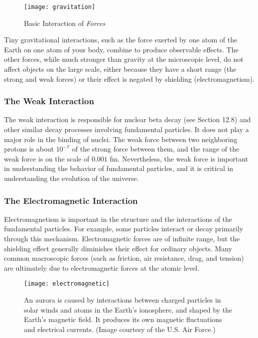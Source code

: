 \documentclass[12pt, a4paper]{article}
\begin{document}
\begin{figure}
\texttt{[image: gravitation]}
\caption{Basic Interaction of \emph{Forces}}
\end{figure}
\noindent
Tiny gravitational interactions, such as the force
exerted by one atom of the Earth on one atom of your body, combine to produce
observable effects. The other forces, while much stronger than gravity at the
microscopic level, do not affect objects on the large scale, either because they
have a short range (the strong and weak forces) or their effect is negated by
shielding (electromagnetism).

\subsubsection*{The Weak Interaction}  The weak interaction is responsible for nuclear beta
decay (see Section 12.8) and other similar decay processes involving fundamental
particles. It does not play a major role in the binding of nuclei. The weak force
between two neighboring protons is about $10^{-7}$ of the strong force between them,
and the range of the weak force is on the scale of $0.001$ fm. Nevertheless, the
weak force is important in understanding the behavior of fundamental particles,
and it is critical in understanding the evolution of the universe.

\subsubsection*{The Electromagnetic Interaction }  Electromagnetism is important in the
structure and the interactions of the fundamental particles. For example, some
particles interact or decay primarily through this mechanism. Electromagnetic
forces are of infinite range, but the shielding effect generally diminishes their
effect for ordinary objects. Many common macroscopic forces (such as friction,
air resistance, drag, and tension) are ultimately due to electromagnetic forces at the
atomic level. 

\begin{figure}
\centering
\texttt{[image: electromagnetic]}
\caption{\scriptsize An aurora is caused by interactions between charged particles in solar winds and atoms in the Earth's ionosphere, and shaped by the Earth's magnetic field. It produces its own magnetic fluctuations and electrical currents. (Image courtesy of the U.S. Air Force.)}
\end{figure}
\end{document}

